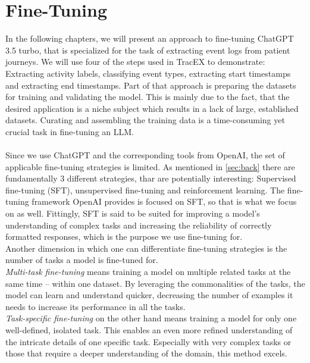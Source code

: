 \section{Fine-Tuning}\label{sec:fine}
In the following chapters, we will present an approach to fine-tuning ChatGPT 3.5 turbo, that is specialized for the task of extracting event logs from patient journeys. We will use four of the steps used in TracEX to demonstrate: Extracting activity labels, classifying event types, extracting start timestamps and extracting end timestamps. Part of that approach is preparing the datasets for training and validating the model. This is mainly due to the fact, that the desired application is a niche subject which results in a lack of large, established datasets. Curating and assembling the training data is a time-consuming yet crucial task in fine-tuning an LLM.\\\\
Since we use ChatGPT and the corresponding tools from OpenAI, the set of applicable fine-tuning strategies is limited. As mentioned in \ref{sec:back} there are fundamentally 3 different strategies, thar are potentially interesting: Supervised fine-tuning (SFT), unsupervised fine-tuning and reinforcement learning. The fine-tuning framework OpenAI provides is focused on SFT, so that is what we focus on as well. Fittingly, SFT is said to be suited for improving a model's understanding of complex tasks and increasing the reliability of correctly formatted responses, which is the purpose we use fine-tuning for.\\
Another dimension in which one can differentiate fine-tuning strategies is the number of tasks a model is fine-tuned for.\\
\emph{Multi-task fine-tuning} means training a model on multiple related tasks at the same time – within one dataset. By leveraging the commonalities of the tasks, the model can learn and understand quicker, decreasing the number of examples it needs to increase its performance in all the tasks.\\
\emph{Task-specific fine-tuning} on the other hand means training a model for only one well-defined, isolated task. This enables an even more refined understanding of the intricate details of one specific task. Especially with very complex tasks or those that require a deeper understanding of the domain, this method excels.\\\\
